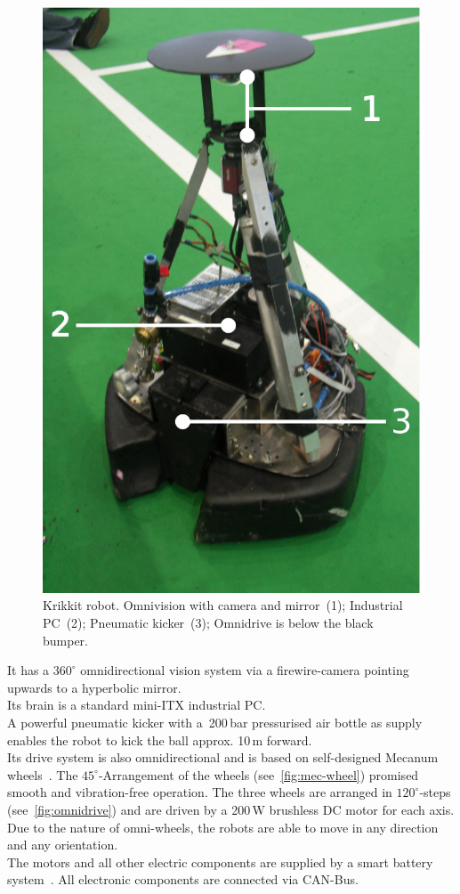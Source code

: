\documentclass[12pt,a4paper]{article}
\begin{document}
\begin{figure}[ht]
\begin{center}
\includegraphics[width=0.5\columnwidth]{figures/krikkit.pdf}
\caption{\label{fig:krikkit}
Krikkit robot. Omnivision with camera and mirror~(1); Industrial PC~(2); Pneumatic kicker~(3); Omnidrive is below the black bumper.
}
\end{center}
\end{figure}

It has a $360^\circ$ omnidirectional vision system via a firewire-camera pointing upwards to a hyperbolic mirror.\\
Its brain is a standard mini-ITX industrial PC.\\
A powerful pneumatic kicker with a~200\,bar pressurised air bottle as supply enables the robot to kick the ball approx. 10\,m forward.\\
Its drive system is also omnidirectional and is based on self-designed Mecanum wheels~\cite{mecanum2007}. 
The $45^\circ$-Arrangement of the wheels (see~\autoref{fig:mec-wheel}) promised smooth and vibration-free operation.
The three wheels are arranged in $120^\circ$-steps (see~\autoref{fig:omnidrive}) and are driven by a 200\,W brushless DC motor for each axis.
Due to the nature of omni-wheels, the robots are able to move in any direction and any orientation.\\
The motors and all other electric components are supplied by a smart battery system~\cite{krammer06}.
All electronic components are connected via CAN-Bus.
\end{document}
